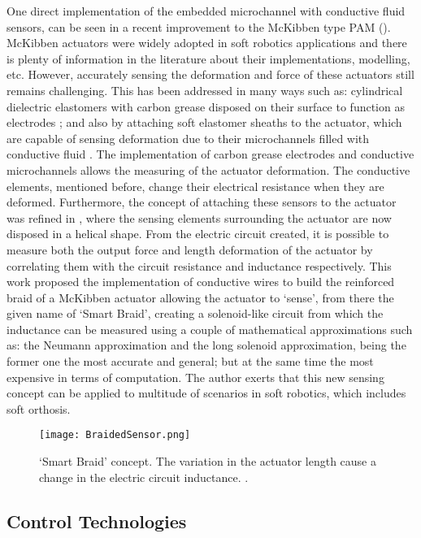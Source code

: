One direct implementation of the embedded microchannel with conductive fluid sensors, can be seen in a recent improvement to the McKibben type PAM (). McKibben actuators were widely adopted in soft robotics applications and there is plenty of information in the literature about their implementations, modelling, etc. However, accurately sensing the deformation and force of these actuators still remains challenging. This has been addressed in many ways such as: cylindrical dielectric elastomers with carbon grease disposed on their surface to function as electrodes \cite{Goulbourne2007}; and also by attaching soft elastomer sheaths to the actuator, which are capable of sensing deformation due to their microchannels filled with conductive fluid \cite{Park2013}. The implementation of carbon grease electrodes and conductive microchannels allows the measuring of the actuator deformation. The conductive elements, mentioned before, change their electrical resistance when they are deformed. Furthermore, the concept of attaching these sensors to the actuator was refined in \cite{Felt2014,Felt2015}, where the sensing elements surrounding the actuator are now disposed in a helical shape. From the electric circuit created, it is possible to measure both the output force and length deformation of the actuator by correlating them with the circuit resistance and inductance respectively. This work proposed the implementation of conductive wires to build the reinforced braid of a McKibben actuator allowing the actuator to `sense', from there the given name of `Smart Braid', creating a solenoid-like circuit from which the inductance can be measured using a couple of mathematical approximations such as: the Neumann approximation and the long solenoid approximation, being the former one the most accurate and general; but at the same time the most expensive in terms of computation. The author exerts that this new sensing concept can be applied to multitude of scenarios in soft robotics, which includes soft orthosis.
\begin{figure}[hbtp!]
    \centering
    \texttt{[image: BraidedSensor.png]}
    \caption{`Smart Braid' concept. The variation in the actuator length cause a change in the electric circuit inductance. \cite{Felt2015}. }
    \label{fig:braided_sensor}
\end{figure}

\subsection{Control Technologies} \label{sec:controlSystems}

